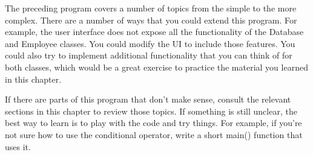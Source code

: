 
The preceding program covers a number of topics from the simple to the more complex. There are a number of ways that you could extend this program. For example, the user interface does not expose all the functionality of the Database and Employee classes. You could modify the UI to include those features. You could also try to implement additional functionality that you can think of for both classes, which would be a great exercise to practice the material you learned in this chapter.

If there are parts of this program that don’t make sense, consult the relevant sections in this chapter to review those topics. If something is still unclear, the best way to learn is to play with the code and try things. For example, if you’re not sure how to use the conditional operator, write a short main() function that uses it.




